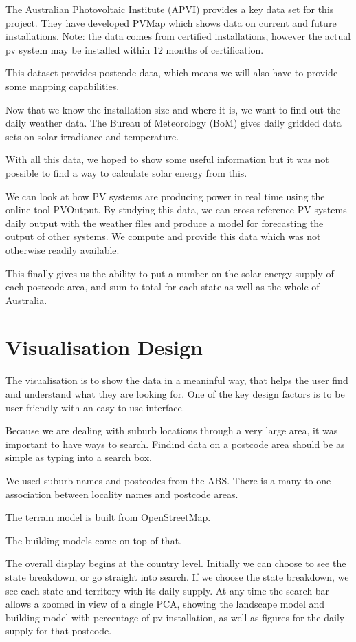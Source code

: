\documentclass[10pt, a4paper]{article}
\begin{document}
\begin{multicols}{2}
The Australian Photovoltaic Institute (APVI)\cite{apvi} provides a key data set for this project. They have developed PVMap\cite{pvmap} which shows data on current and future installations. Note: the data comes from certified installations, however the actual pv system may be installed within 12 months of certification.

This dataset provides postcode data, which means we will also have to provide some mapping capabilities. 

Now that we know the installation size and where it is, we want to find out the daily weather data. The Bureau of Meteorology (BoM) gives daily gridded data sets on solar irradiance and temperature. 

With all this data, we hoped to show some useful information but it was not possible to find a way to calculate solar energy from this. 

We can look at how PV systems are producing power in real time using the online tool PVOutput\cite{pvoutput}. By studying this data, we can cross reference PV systems daily output with the weather files and produce a model for forecasting the output of other systems. We compute and provide this data which was not otherwise readily available. 

This finally gives us the ability to put a number on the solar energy supply of each postcode area, and sum to total for each state as well as the whole of Australia.

\section{Visualisation Design}

The visualisation is to show the data in a meaninful way, that helps the user find and understand what they are looking for. One of the key design factors is to be user friendly with an easy to use interface. 

Because we are dealing with suburb locations through a very large area, it was important to have ways to search. Findind data on a postcode area should be as simple as typing into a search box.

We used suburb names and postcodes from the ABS. There is a many-to-one association between locality names and postcode areas.

The terrain model is built from OpenStreetMap.

The building models come on top of that. 

The overall display begins at the country level. Initially we can choose to see the state breakdown, or go straight into search.  If we choose the state breakdown, we see each state and territory with its daily supply. At any time the search bar allows a zoomed in view of a single PCA, showing the landscape model and building model with percentage of pv installation, as well as figures for the daily supply for that postcode. 




\end{multicols}
\end{document}
